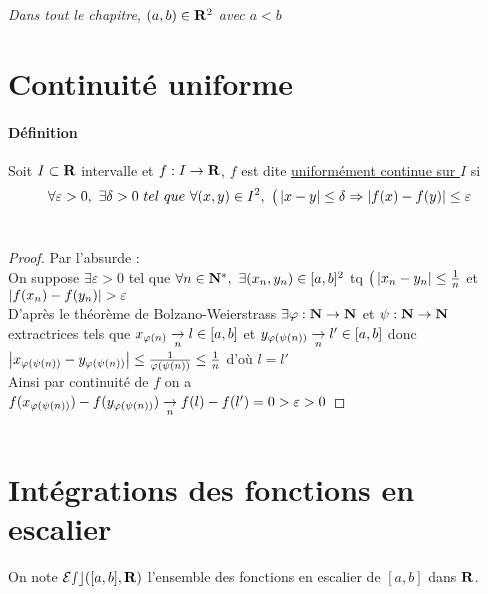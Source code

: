 

\minitoc
\textit{Dans tout le chapitre, $(a,b)\in{\mathbf{R}}^2$ avec $a<b$}
	\section{Continuité uniforme}
		\traitd
		\paragraph{Définition}
			Soit $I\subset{\mathbf{R}}$ intervalle et $f:I\rightarrow {\mathbf{R}}$, $f$ est dite \underline{uniformément continue sur $I$} si
			\[ \forall \varepsilon >0 ,~\exists \delta>0 ~tel~que~\forall (x,y)\in I^2,~\big( \left\vert x-y \right\vert\leq \delta \Rightarrow \left\vert f(x)-f(y) \right\vert\leq 
			\varepsilon \] \vspace*{-0.7cm} \trait
		\vspace*{0.5cm} \\ 
		\begin{proof}
		Par l'absurde : \\On suppose $\exists \varepsilon >0$ tel que $\forall n\in{\mathbf{N}}^* ,~\exists (x_n,y_n)\in [a,b]^2$ tq $\big( \left\vert x_n-y_n \right\vert 
		\leq \frac{1}{n}$ et $\left\vert f(x_n)-f(y_n) \right\vert > \varepsilon$ \\ D'après le théorème de Bolzano-Weierstrass %
        $\exists 
		\varphi :{\mathbf{N}} \rightarrow{\mathbf{N}}$ et $\psi : {\mathbf{N}}\rightarrow{\mathbf{N}}$ extractrices tels que $x_{\varphi(n)} \underset{n}{\rightarrow} l \in [a,b]$ et $y_{\varphi(\psi(n))} 
		\underset{n}{\rightarrow} l' \in[a,b]$ donc $\left\vert x_{\varphi(\psi(n))}-y_{\varphi(\psi(n))} \right\vert\leq \frac{1}{\varphi(\psi(n))} \leq \frac{1}{n}$ d'où $l=l'$ \\
		Ainsi par continuité de $f$ on a $f(x_{\varphi(\psi(n))}) - f(y_{\varphi(\psi(n))}) \underset{n}{\rightarrow} f(l)-f(l') = 0 >\varepsilon >0$
		\end{proof} ${}$
	\section{Intégrations des fonctions en escalier}
	On note $\mathcal{Esc}([a,b],{\mathbf{R}})$ l'ensemble des fonctions en escalier de $[a,b]$ dans ${\mathbf{R}}$.
